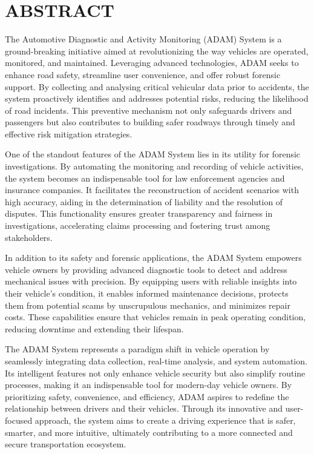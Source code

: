 \chapter*{\centering ABSTRACT}
\justify
The Automotive Diagnostic and Activity Monitoring (ADAM) System is a ground-breaking initiative aimed at revolutionizing the way vehicles are operated, monitored, and maintained. Leveraging advanced technologies, ADAM seeks to enhance road safety, streamline user convenience, and offer robust forensic support. By collecting and analysing critical vehicular data prior to accidents, the system proactively identifies and addresses potential risks, reducing the likelihood of road incidents. This preventive mechanism not only safeguards drivers and passengers but also contributes to building safer roadways through timely and effective risk mitigation strategies.

\vspace{1em} %

One of the standout features of the ADAM System lies in its utility for forensic investigations. By automating the monitoring and recording of vehicle activities, the system becomes an indispensable tool for law enforcement agencies and insurance companies. It facilitates the reconstruction of accident scenarios with high accuracy, aiding in the determination of liability and the resolution of disputes. This functionality ensures greater transparency and fairness in investigations, accelerating claims processing and fostering trust among stakeholders.

\vspace{1em} %

In addition to its safety and forensic applications, the ADAM System empowers vehicle owners by providing advanced diagnostic tools to detect and address mechanical issues with precision. By equipping users with reliable insights into their vehicle's condition, it enables informed maintenance decisions, protects them from potential scams by unscrupulous mechanics, and minimizes repair costs. These capabilities ensure that vehicles remain in peak operating condition, reducing downtime and extending their lifespan.

\vspace{1em} %

The ADAM System represents a paradigm shift in vehicle operation by seamlessly integrating data collection, real-time analysis, and system automation. Its intelligent features not only enhance vehicle security but also simplify routine processes, making it an indispensable tool for modern-day vehicle owners. By prioritizing safety, convenience, and efficiency, ADAM aspires to redefine the relationship between drivers and their vehicles. Through its innovative and user-focused approach, the system aims to create a driving experience that is safer, smarter, and more intuitive, ultimately contributing to a more connected and secure transportation ecosystem.
